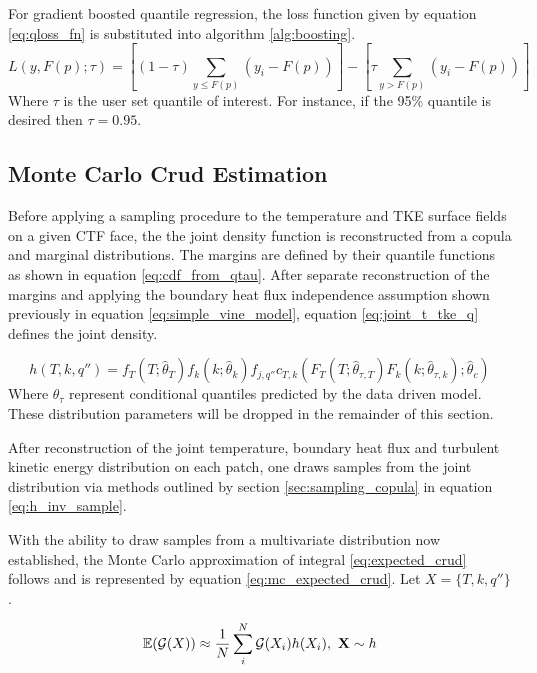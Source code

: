 For gradient boosted quantile regression, the loss function given by equation \ref{eq:qloss_fn} is substituted into algorithm \ref{alg:boosting}.
\begin{equation}
L(y, F(p);\tau) = \left[ (1-\tau) \sum_{y \leq F(p)}( y_i - F(p) ) \right] - \left[ \tau \sum_{y > F(p)} (y_i - F(p)) \right]
\end{equation}
Where $\tau$ is the user set quantile of interest. For instance, if the 95\% quantile is desired then $\tau=0.95$.



\subsection{Monte Carlo Crud Estimation}
\label{chap:mc_crud}

Before applying a sampling procedure to the temperature and TKE surface fields on a given CTF face, the the joint density function is reconstructed from a copula and marginal distributions.  The margins are defined by their quantile functions as shown in equation \ref{eq:cdf_from_qtau}.  After separate reconstruction of the margins and applying the boundary heat flux independence assumption shown previously in equation \ref{eq:simple_vine_model}, equation \ref{eq:joint_t_tke_q} defines the joint density.

\begin{equation}
h(T, k, q'') = f_T(T;\hat \theta_T) f_k(k;\hat \theta_k) f_{j,q''} 
c_{T,k}(F_T(T;\hat \theta_{\tau,T})F_k(k;\hat \theta_{\tau,k});\hat \theta_c)
\label{eq:joint_t_tke_q}
\end{equation} 
Where $\theta_\tau$ represent conditional quantiles predicted by the data driven model.  These distribution parameters will be dropped in the remainder of this section.

After reconstruction of the joint temperature, boundary heat flux and turbulent kinetic energy distribution on each patch, one draws samples from the joint distribution via methods outlined by section \ref{sec:sampling_copula} in equation \ref{eq:h_inv_sample}.  

With the ability to draw samples from a multivariate distribution now established, the Monte Carlo approximation of integral \ref{eq:expected_crud} follows and is represented by equation \ref{eq:mc_expected_crud}.  Let $X=\{T,k,q''\}$.

\begin{equation}
\operatorname*{\mathbb{E}}(\mathcal G(X)) \approx \frac{1}{N} \sum_i^N \mathcal G(X_i) h(X_i), \ \mathbf{X} \sim {h}
\label{eq:mc_expected_crud}
\end{equation}

